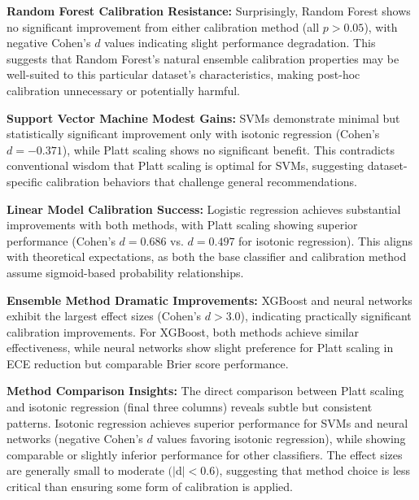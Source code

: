 \documentclass[12pt, a4paper]{article}
\begin{document}
\textbf{Random Forest Calibration Resistance:} Surprisingly, Random Forest shows no significant improvement from either calibration method (all $p > 0.05$), with negative Cohen's $d$ values indicating slight performance degradation. This suggests that Random Forest's natural ensemble calibration properties may be well-suited to this particular dataset's characteristics, making post-hoc calibration unnecessary or potentially harmful.

\textbf{Support Vector Machine Modest Gains:} SVMs demonstrate minimal but statistically significant improvement only with isotonic regression (Cohen's $d = -0.371$), while Platt scaling shows no significant benefit. This contradicts conventional wisdom that Platt scaling is optimal for SVMs, suggesting dataset-specific calibration behaviors that challenge general recommendations.

\textbf{Linear Model Calibration Success:} Logistic regression achieves substantial improvements with both methods, with Platt scaling showing superior performance (Cohen's $d = 0.686$ vs. $d = 0.497$ for isotonic regression). This aligns with theoretical expectations, as both the base classifier and calibration method assume sigmoid-based probability relationships.

\textbf{Ensemble Method Dramatic Improvements:} XGBoost and neural networks exhibit the largest effect sizes (Cohen's $d > 3.0$), indicating practically significant calibration improvements. For XGBoost, both methods achieve similar effectiveness, while neural networks show slight preference for Platt scaling in ECE reduction but comparable Brier score performance.

\textbf{Method Comparison Insights:} The direct comparison between Platt scaling and isotonic regression (final three columns) reveals subtle but consistent patterns. Isotonic regression achieves superior performance for SVMs and neural networks (negative Cohen's $d$ values favoring isotonic regression), while showing comparable or slightly inferior performance for other classifiers. The effect sizes are generally small to moderate $(|$d$| < 0.6)$, suggesting that method choice is less critical than ensuring some form of calibration is applied.
\end{document}

